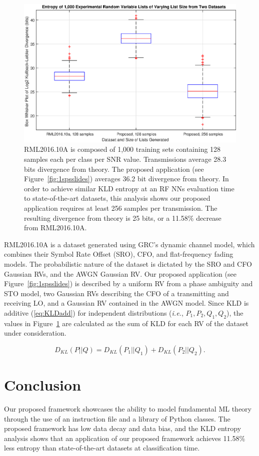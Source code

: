 \begin{figure}[ht!]
	\centering	\includegraphics[width=1\textwidth,keepaspectratio]{figs/kldiv.eps}
    \caption{RML2016.10A is composed of 1,000 training sets containing 128 samples each per class per SNR value. Transmissions average 28.3 bits divergence from theory. The proposed application (see Figure~\ref{fig:1spsslides}) averages 36.2 bit divergence from theory. In order to achieve similar KLD entropy at an RF NNs evaluation time to state-of-the-art datasets, this analysis shows our proposed application requires at least 256 samples per transmission. The resulting divergence from theory is 25 bits, or a 11.58\% decrease from RML2016.10A.} 
\label{fig:kldiv}      
\end{figure}


\noindent RML2016.10A is a dataset generated using GRC's dynamic channel model, which combines their Symbol Rate Offset (SRO), CFO, and flat-frequency fading models. The probabilistic nature of the dataset is dictated by the SRO and CFO Gaussian RVs, and the AWGN Gaussian RV. Our proposed application (see Figure~\ref{fig:1spsslides}) is described by a uniform RV from a phase ambiguity and STO model, two Gaussian RVs describing the CFO of a transmitting and receiving LO, and a Gaussian RV contained in the AWGN model. Since KLD is additive (\ref{eq:KLDadd}) for independent distributions (\textit{i.e.}, $P_1,P_2,Q_1,Q_2$), the values in Figure~\ref{fig:kldiv} are calculated as the sum of KLD for each RV of the dataset under consideration.

\begin{equation}
\label{eq:KLDadd}
D_{KL}(P||Q) = D_{KL}(P_1||Q_1) + D_{KL}(P_2||Q_2).
\end{equation}

\section{Conclusion}
\label{sec5}
Our proposed framework showcases the ability to model fundamental ML theory through the use of an instruction file and a library of Python classes. The proposed framework has low data decay and data bias, and the KLD entropy analysis shows that an application of our proposed framework achieves 11.58\% less entropy than state-of-the-art datasets at classification time.

